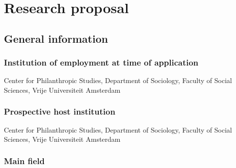 \documentclass[twocolumn, serif, rga, numeric]{jote-article}
\begin{document}

 {}\section*{Research proposal} 
\vspace{\baselineskip}
 {}\subsection*{General information}

\subsubsection*{Institution of employment at time of application}

Center for Philanthropic Studies, Department of Sociology, Faculty of Social Sciences, Vrije Universiteit Amsterdam

\subsubsection*{Prospective host institution}

Center for Philanthropic Studies, Department of Sociology, Faculty of Social Sciences, Vrije Universiteit Amsterdam

\subsubsection*{Main field}
\end{document}
